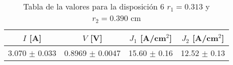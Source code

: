 \begin{table}[H]
    \centering
\begin{tabular}{cccc}
\toprule
$I$ [A] & $V$ [V] & $J_1$ [A/cm$^2$] & $J_2$ [A/cm$^2$] \\
\midrule
3.070 $\pm$ 0.033 & 0.8969 $\pm$ 0.0047 & 15.60 $\pm$ 0.16 & 12.52 $\pm$ 0.13 \\
\bottomrule
\end{tabular}
    \caption{Tabla de la valores para la disposición 6 $r_1=0.313$ y $r_2=0.390$ cm }
    \label{Tab:VIJ_mini_6}
\end{table}
